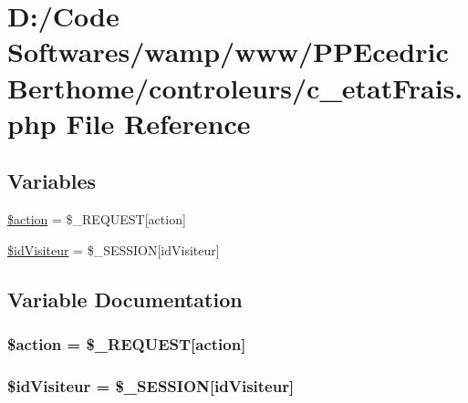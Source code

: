\hypertarget{c__etat_frais_8php}{}\section{D\+:/\+Code Softwares/wamp/www/\+P\+P\+Ecedric\+Berthome/controleurs/c\+\_\+etat\+Frais.php File Reference}
\label{c__etat_frais_8php}
\subsection*{Variables}
\begin{DoxyCompactItemize}
\item 
\hyperlink{c__etat_frais_8php_aa698a3e72116e8e778be0e95d908ee30}{\$action} = \$\+\_\+\+R\+E\+Q\+U\+E\+ST\mbox{[}\textquotesingle{}action\textquotesingle{}\mbox{]}
\item 
\hyperlink{c__etat_frais_8php_a06480cb765d32df12f67a3589b6b9507}{\$id\+Visiteur} = \$\+\_\+\+S\+E\+S\+S\+I\+ON\mbox{[}\textquotesingle{}id\+Visiteur\textquotesingle{}\mbox{]}
\end{DoxyCompactItemize}


\subsection{Variable Documentation}
\subsubsection[{\texorpdfstring{\$action}{$action}}]{\setlength{\rightskip}{0pt plus 5cm}\$action = \$\+\_\+\+R\+E\+Q\+U\+E\+ST\mbox{[}\textquotesingle{}action\textquotesingle{}\mbox{]}}\hypertarget{c__etat_frais_8php_aa698a3e72116e8e778be0e95d908ee30}{}\label{c__etat_frais_8php_aa698a3e72116e8e778be0e95d908ee30}
\subsubsection[{\texorpdfstring{\$id\+Visiteur}{$idVisiteur}}]{\setlength{\rightskip}{0pt plus 5cm}\$id\+Visiteur = \$\+\_\+\+S\+E\+S\+S\+I\+ON\mbox{[}\textquotesingle{}id\+Visiteur\textquotesingle{}\mbox{]}}\hypertarget{c__etat_frais_8php_a06480cb765d32df12f67a3589b6b9507}{}\label{c__etat_frais_8php_a06480cb765d32df12f67a3589b6b9507}
